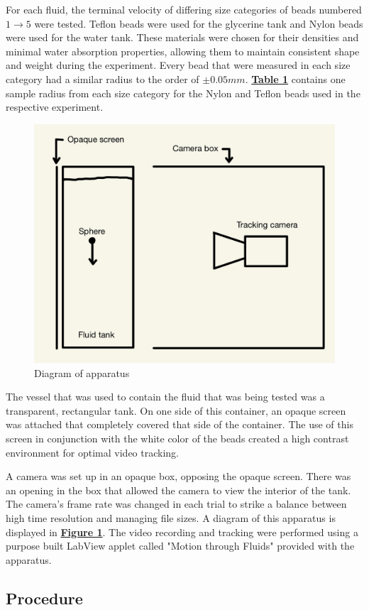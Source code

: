 \documentclass[
	letterpaper
	12pt
]{template}
\newcommand{\bref}[2]{\textbf{\hyperref[#1]{#2}}}
\begin{document}
For each fluid, the terminal velocity of differing size categories of beads numbered $1\rightarrow 5$ were tested. Teflon beads were used for the glycerine tank and Nylon beads were used for the water tank. These materials were chosen for their densities and minimal water absorption properties, allowing them to maintain consistent shape and weight during the experiment. Every bead that were measured in each size category had a similar radius to the order of $\pm 0.05\unit{mm}$.  \bref{tab::beadSize}{Table 1} contains one sample radius from each size category for the Nylon and Teflon beads used in the respective experiment.\vspace{\baselineskip}

\begin{figure}\label{fig::apparatus}
	\centering
	\vspace{-10pt}
	\includegraphics[width=.35\textwidth]{figures/apparatus.jpg}
	\caption{Diagram of apparatus}
	\vspace{-20pt}
\end{figure}
The vessel that was used to contain the fluid that was being tested was a transparent, rectangular tank. On one side of this container, an opaque screen was attached that completely covered that side of the container. The use of this screen in conjunction with the white color of the beads created a high contrast environment for optimal video tracking. \vspace{\baselineskip}

A camera was set up in an opaque box, opposing the opaque screen. There was an opening in the box that allowed the camera to view the interior of the tank. The camera's frame rate was changed in each trial to strike a balance between high time resolution and managing file sizes. A diagram of this apparatus is displayed in \bref{fig::apparatus}{Figure 1}. The video recording and tracking were performed using a purpose built LabView applet called "Motion through Fluids" provided with the apparatus.
\subsection{Procedure}
\end{document}
